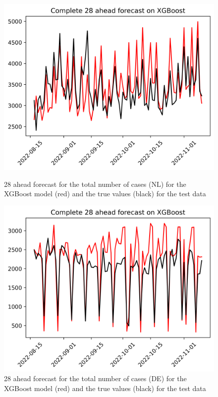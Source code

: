 \begin{figure}

\begin{minipage}{.45\textwidth}
  \centering
  \includegraphics[width=\linewidth]{pics/28_ah/Complete_28_ahead_XGBoost.png}
  \caption{28 ahead forecast for the total number of cases (NL) for the XGBoost model (red) and the true values (black) for the test data}
  \label{fig:tot_cases_fc_28_xgb}
\end{minipage}
\begin{minipage}{.45\textwidth}
  \centering
  \includegraphics[width=\linewidth]{pics/28_ah/DE_Complete_28_ahead_XGBoost.png}
  \caption{28 ahead forecast for the total number of cases (DE) for the XGBoost model (red) and the true values (black) for the test data}
  \label{fig:tot_cases_fc_28_xgb_DE}
\end{minipage}

\end{figure}
